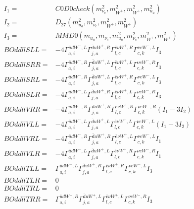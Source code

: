 \documentclass[A4,landscape]{article}
\begin{document}
\begin{align} 
I_1 = & C0D0check(m^2_{\nu_{{c}}}, m^2_{W^+}, m^2_{W^+}, m^2_{u_{{a}}}) \\ 
I_2 = & D_{27}(m^2_{u_{{a}}}, m^2_{\nu_{{c}}}, m^2_{W^+}, m^2_{W^+}) \\ 
I_3 = & MMD0(m_{u_{{a}}}, m_{\nu_{{c}}}, m^2_{u_{{a}}}, m^2_{\nu_{{c}}}, m^2_{W^+}, m^2_{W^+}) \\ 
  BOddllSLL= & -4  \Gamma^{\bar{u}d W^-,L}_{a, i} \Gamma^{\bar{d}u W^+ ,R}_{j, a} \Gamma^{\bar{e}\nu W^+ ,R}_{l, c} \Gamma^{\nu e W^-,L}_{c, k} I_3 \\ 
  BOddllSRR= & -4  \Gamma^{\bar{u}d W^-,R}_{a, i} \Gamma^{\bar{d}u W^+ ,L}_{j, a} \Gamma^{\bar{e}\nu W^+ ,L}_{l, c} \Gamma^{\nu e W^-,R}_{c, k} I_3 \\ 
  BOddllSRL= & -4  \Gamma^{\bar{u}d W^-,R}_{a, i} \Gamma^{\bar{d}u W^+ ,L}_{j, a} \Gamma^{\bar{e}\nu W^+ ,R}_{l, c} \Gamma^{\nu e W^-,L}_{c, k} I_3 \\ 
  BOddllSLR= & -4  \Gamma^{\bar{u}d W^-,L}_{a, i} \Gamma^{\bar{d}u W^+ ,R}_{j, a} \Gamma^{\bar{e}\nu W^+ ,L}_{l, c} \Gamma^{\nu e W^-,R}_{c, k} I_3 \\ 
  BOddllVRR= & -4  \Gamma^{\bar{u}d W^-,R}_{a, i} \Gamma^{\bar{d}u W^+ ,R}_{j, a} \Gamma^{\bar{e}\nu W^+ ,R}_{l, c} \Gamma^{\nu e W^-,R}_{c, k} (I_1 - 3 I_2) \\ 
  BOddllVLL= & -4  \Gamma^{\bar{u}d W^-,L}_{a, i} \Gamma^{\bar{d}u W^+ ,L}_{j, a} \Gamma^{\bar{e}\nu W^+ ,L}_{l, c} \Gamma^{\nu e W^-,L}_{c, k} (I_1 - 3 I_2) \\ 
  BOddllVRL= & -4  \Gamma^{\bar{u}d W^-,R}_{a, i} \Gamma^{\bar{d}u W^+ ,R}_{j, a} \Gamma^{\bar{e}\nu W^+ ,L}_{l, c} \Gamma^{\nu e W^-,L}_{c, k} I_1 \\ 
  BOddllVLR= & -4  \Gamma^{\bar{u}d W^-,L}_{a, i} \Gamma^{\bar{d}u W^+ ,L}_{j, a} \Gamma^{\bar{e}\nu W^+ ,R}_{l, c} \Gamma^{\nu e W^-,R}_{c, k} I_1 \\ 
  BOddllTLL= &  \Gamma^{\bar{u}d W^-,L}_{a, i} \Gamma^{\bar{d}u W^+ ,R}_{j, a} \Gamma^{\bar{e}\nu W^+ ,R}_{l, c} \Gamma^{\nu e W^-,L}_{c, k} I_3 \\ 
  BOddllTLR= & 0 \\ 
  BOddllTRL= & 0 \\ 
  BOddllTRR= &  \Gamma^{\bar{u}d W^-,R}_{a, i} \Gamma^{\bar{d}u W^+ ,L}_{j, a} \Gamma^{\bar{e}\nu W^+ ,L}_{l, c} \Gamma^{\nu e W^-,R}_{c, k} I_3 \\ 
\end{align} 
\end{document}
